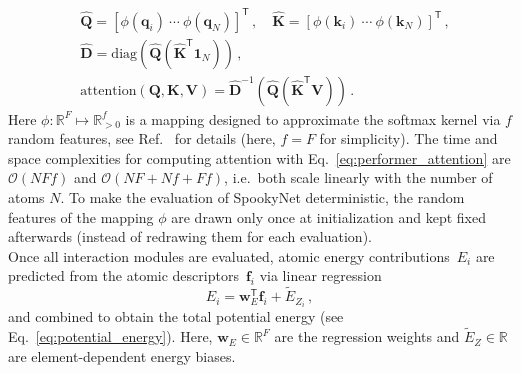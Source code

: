 \documentclass[%
superscriptaddress,
reprint,
nofootinbib,
amsmath,amssymb,amsfonts,
floatfix,
altaffilletter,
showkeys,
]{revtex4-2}
\newcommand{\nn}{SpookyNet}
\begin{document}
\begin{equation}
\begin{aligned}
&\widehat{\mathbf{Q}} = \left[\phi(\mathbf{q}_i) \ \cdots \ \phi(\mathbf{q}_N)\right]^{\mathsf{T}}\,,\quad \widehat{\mathbf{K}} = \left[\phi(\mathbf{k}_i) \ \cdots \ \phi(\mathbf{k}_N)\right]^{\mathsf{T}}\,,\\
&\widehat{\mathbf{D}}=\mathrm{diag}\left(
\widehat{\mathbf{Q}}\left(\widehat{\mathbf{K}}^{\mathsf{T}}\mathbf{1}_N\right)\right)\,,\\
&\mathrm{attention}(\mathbf{Q},\mathbf{K}, \mathbf{V}) = \widehat{\mathbf{D}}^{-1}(\widehat{\mathbf{Q}}(\widehat{\mathbf{K}}^{\mathsf{T}}\mathbf{V}))\,.
\end{aligned}
\label{eq:performer_attention}
\end{equation}
Here $\phi:\mathbb{R}^{F}\mapsto\mathbb{R}_{>0}^{f}$ is a mapping designed to approximate the softmax kernel via $f$ random features, see Ref.~ for details (here, $f=F$ for simplicity). The time and space complexities for computing attention with Eq.~\ref{eq:performer_attention} are $\mathcal{O}(NFf)$ and $\mathcal{O}(NF+Nf+Ff)$,\cite{choromanski2020rethinking} i.e.\ both scale linearly with the number of atoms $N$. To make the evaluation of \nn{} deterministic, the random features of the mapping $\phi$ are drawn only once at initialization and kept fixed afterwards (instead of redrawing them for each evaluation).\\

Once all interaction modules are evaluated, atomic energy contributions~$E_i$ are predicted from the atomic descriptors~$\mathbf{f}_i$ via linear regression
\begin{equation}
E_i = \mathbf{w}_E^{\mathsf{T}}\mathbf{f}_i + \tilde{E}_{Z_i}\,,
\label{eq:atomic_energy}
\end{equation}
and combined to obtain the total potential energy (see Eq.~\ref{eq:potential_energy}).
Here, $\mathbf{w}_E \in \mathbb{R}^F$ are the regression weights and $\tilde{E}_{Z}\in\mathbb{R}$ are element-dependent energy biases.
\end{document}
